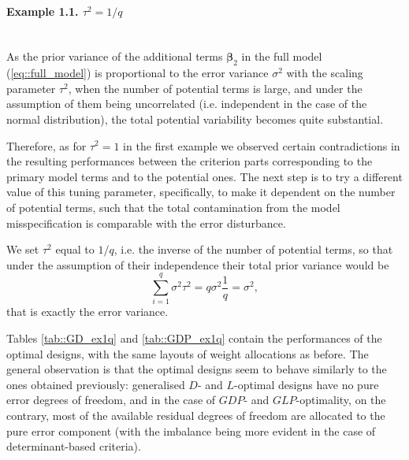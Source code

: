\paragraph{Example 1.1. $\tau^2=1/q$}\mbox{}\\
As the prior variance of the additional terms $\bm{\beta}_2$ in the full model (\ref{eq::full_model}) is proportional to the error variance $\sigma^2$ with the scaling parameter $\tau^2$, when the number of potential terms is large, and under the assumption of them being uncorrelated (i.e. independent in the case of the normal distribution), the total potential variability becomes quite substantial.

Therefore, as for $\tau^2=1$ in the first example we observed certain contradictions in the resulting performances between the criterion parts corresponding to the primary model terms and to the potential ones. The next step is to try a different value of this tuning parameter, specifically, to make it dependent on the number of potential terms, such that the total contamination from the model misspecification is comparable with the error disturbance. 

We set $\tau^2$ equal to $1/q$, i.e. the inverse of the number of potential terms, so that under the assumption of their independence their total prior variance would be 
\begin{equation}
\sum_{i=1}^{q} \sigma^{2} \tau^{2} = q\sigma^{2} \frac{1}{q}=\sigma^{2},
\end{equation}
that is exactly the error variance.

Tables \ref{tab::GD_ex1q} and \ref{tab::GDP_ex1q} contain the performances of the optimal designs, with the same layouts of weight allocations as before. The general observation is that the optimal designs seem to behave similarly to the ones obtained previously: generalised $D$- and $L$-optimal designs have no pure error degrees of freedom, and in the case of $GDP$- and $GLP$-optimality, on the contrary, most of the available residual degrees of freedom are allocated to the pure error component (with the imbalance being more evident in the case of determinant-based criteria). 

